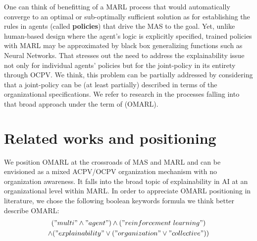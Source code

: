 \documentclass[runningheads]{llncs}
\begin{document}
One can think of benefitting of a MARL process that would automatically converge to an optimal or sub-optimally sufficient solution as for establishing the rules in agents (called \textbf{policies}) that drive the MAS to the goal. Yet, unlike human-based design where the agent's logic is explicitly specified, trained policies with MARL may be approximated by black box generalizing functions such as Neural Networks. That stresses out the need to address the explainability issue not only for individual agents' policies but for the joint-policy in its entirety through OCPV. We think, this problem can be partially addressed by considering that a joint-policy can be (at least partially) described in terms of the organizational specifications. We refer to research in the processes falling into that broad approach under the term of  (OMARL).


\section{Related works and positioning}




We position OMARL at the crossroads of MAS and MARL and can be envisioned as a mixed ACPV/OCPV organization mechanism with no organization awareness. It falls into the broad topic of explainability in AI at an organizational level within MARL. In order to appreciate OMARL positioning in literature, we chose the following boolean keywords formula we think better describe OMARL:
\begin{gather*}
    ("multi" \land "agent") \land ("reinforcement \ learning")\\ \land ("explainability" \lor ("organization" \lor "collective"))
\end{gather*}
\end{document}
